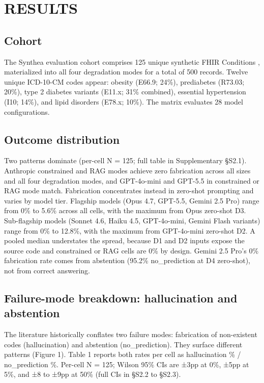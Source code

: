 \section{RESULTS}\label{results}

\subsection{Cohort}\label{cohort}

The Synthea evaluation cohort comprises 125 unique synthetic FHIR
Conditions \autocite{Walonoski2018}, materialized into all four degradation
modes for a total of 500 records. Twelve unique ICD-10-CM codes
appear: obesity (E66.9; 24\%), prediabetes (R73.03; 20\%), type 2
diabetes variants (E11.x; 31\% combined), essential hypertension
(I10; 14\%), and lipid disorders (E78.x; 10\%). The matrix evaluates
28 model configurations.

\subsection{Outcome distribution}\label{outcome-distribution}

Two patterns dominate (per-cell N = 125; full table in
Supplementary §S2.1). Anthropic constrained and RAG modes achieve
zero fabrication across all sizes and all four degradation modes,
and GPT-4o-mini and GPT-5.5 in constrained or RAG mode match.
Fabrication concentrates instead in zero-shot prompting and varies
by model tier. Flagship models (Opus 4.7, GPT-5.5, Gemini 2.5 Pro)
range from 0\% to 5.6\% across all cells, with the maximum from Opus
zero-shot D3. Sub-flagship models (Sonnet 4.6, Haiku 4.5,
GPT-4o-mini, Gemini Flash variants) range from 0\% to 12.8\%, with
the maximum from GPT-4o-mini zero-shot D2. A pooled median
understates the spread, because D1 and D2 inputs expose the source
code and constrained or RAG cells are 0\% by design. Gemini 2.5
Pro's 0\% fabrication rate comes from abstention (95.2\%
no\_prediction at D4 zero-shot), not from correct answering.

\subsection{Failure-mode breakdown: hallucination and abstention}\label{failure-mode-breakdown-hallucination-and-abstention}

The literature historically conflates two failure modes:
fabrication of non-existent codes (hallucination) and abstention
(no\_prediction). They surface different patterns (Figure 1).
Table 1 reports both rates per cell as hallucination \% /
no\_prediction \%. Per-cell N = 125; Wilson 95\% CIs are ±3pp at 0\%,
±5pp at 5\%, and ±8 to ±9pp at 50\% (full CIs in §S2.2 to §S2.3).


